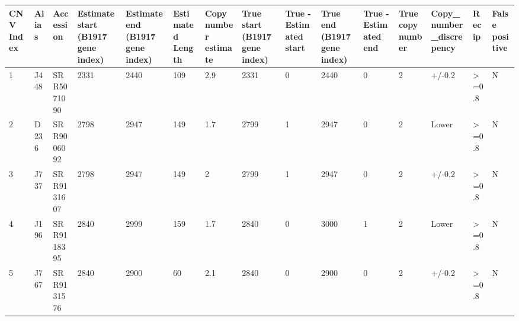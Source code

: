 \documentclass[a4paper]{paper}
\begin{document}
\begin{table}[htp]%
\centering
\small\setlength\tabcolsep{4.5pt}
\begin{tabular}{p{3cm}llllllllllllll}
\hline
CNV Index & Alias & Accession & Estimate start (B1917 gene index) & Estimate end (B1917 gene index) & Estimated Length & Copy number estimate & True start (B1917 gene index) & True -Estimated start & True end (B1917 gene index) & True - Estimated end & True copy number & Copy\_number\_discrepency & Recip & False positive \\ \hline
\multicolumn{1}{|l|}{1} & \multicolumn{1}{l|}{J448} & \multicolumn{1}{l|}{SRR5071090} & \multicolumn{1}{l|}{2331} & \multicolumn{1}{l|}{2440} & \multicolumn{1}{l|}{109} & \multicolumn{1}{l|}{2.9} & \multicolumn{1}{l|}{2331} & \multicolumn{1}{l|}{0} & \multicolumn{1}{l|}{2440} & \multicolumn{1}{l|}{0} & \multicolumn{1}{l|}{2} & \multicolumn{1}{l|}{+/-0.2} & \multicolumn{1}{l|}{\textgreater{}=0.8} & \multicolumn{1}{l|}{N} \\ \hline
\multicolumn{1}{|l|}{2} & \multicolumn{1}{l|}{D236} & \multicolumn{1}{l|}{SRR9006092} & \multicolumn{1}{l|}{2798} & \multicolumn{1}{l|}{2947} & \multicolumn{1}{l|}{149} & \multicolumn{1}{l|}{1.7} & \multicolumn{1}{l|}{2799} & \multicolumn{1}{l|}{1} & \multicolumn{1}{l|}{2947} & \multicolumn{1}{l|}{0} & \multicolumn{1}{l|}{2} & \multicolumn{1}{l|}{Lower} & \multicolumn{1}{l|}{\textgreater{}=0.8} & \multicolumn{1}{l|}{N} \\ \hline
\multicolumn{1}{|l|}{3} & \multicolumn{1}{l|}{J737} & \multicolumn{1}{l|}{SRR9131607} & \multicolumn{1}{l|}{2798} & \multicolumn{1}{l|}{2947} & \multicolumn{1}{l|}{149} & \multicolumn{1}{l|}{2} & \multicolumn{1}{l|}{2799} & \multicolumn{1}{l|}{1} & \multicolumn{1}{l|}{2947} & \multicolumn{1}{l|}{0} & \multicolumn{1}{l|}{2} & \multicolumn{1}{l|}{+/-0.2} & \multicolumn{1}{l|}{\textgreater{}=0.8} & \multicolumn{1}{l|}{N} \\ \hline
\multicolumn{1}{|l|}{4} & \multicolumn{1}{l|}{J196} & \multicolumn{1}{l|}{SRR9118395} & \multicolumn{1}{l|}{2840} & \multicolumn{1}{l|}{2999} & \multicolumn{1}{l|}{159} & \multicolumn{1}{l|}{1.7} & \multicolumn{1}{l|}{2840} & \multicolumn{1}{l|}{0} & \multicolumn{1}{l|}{3000} & \multicolumn{1}{l|}{1} & \multicolumn{1}{l|}{2} & \multicolumn{1}{l|}{Lower} & \multicolumn{1}{l|}{\textgreater{}=0.8} & \multicolumn{1}{l|}{N} \\ \hline
\multicolumn{1}{|l|}{5} & \multicolumn{1}{l|}{J767} & \multicolumn{1}{l|}{SRR9131576} & \multicolumn{1}{l|}{2840} & \multicolumn{1}{l|}{2900} & \multicolumn{1}{l|}{60} & \multicolumn{1}{l|}{2.1} & \multicolumn{1}{l|}{2840} & \multicolumn{1}{l|}{0} & \multicolumn{1}{l|}{2900} & \multicolumn{1}{l|}{0} & \multicolumn{1}{l|}{2} & \multicolumn{1}{l|}{+/-0.2} & \multicolumn{1}{l|}{\textgreater{}=0.8} & \multicolumn{1}{l|}{N} \\ \hline

\end{tabular}
\end{table}
\end{document}
